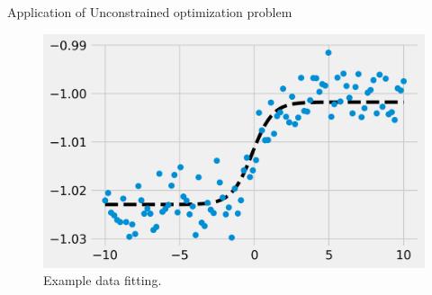 \begin{frame}{Application of Unconstrained optimization problem}
    \begin{figure}[h!]
        \includegraphics[width=0.55\linewidth]{figures/03_curvefitting_14_0.png}
        \caption{Example data fitting.}
    \end{figure}
\end{frame}